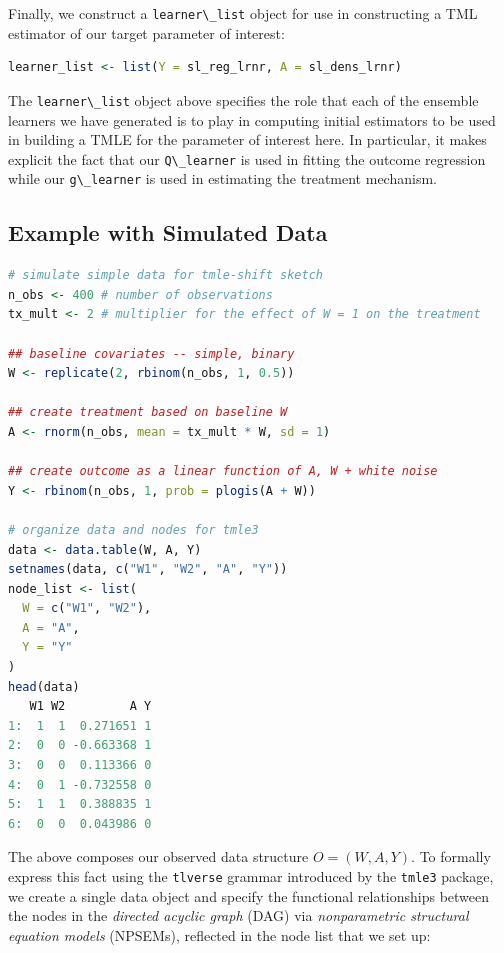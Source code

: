 \documentclass[12pt, krantz2,]{krantz}
\newcommand{\passthrough}[1]{#1}
\theoremstyle{definition}
\theoremstyle{definition}
\theoremstyle{definition}
\newcommand{\1}{\mathbbm{1}}
\begin{document}
Finally, we construct a \passthrough{\lstinline!learner\_list!} object for use in constructing a TML
estimator of our target parameter of interest:

\begin{lstlisting}[language=R]
learner_list <- list(Y = sl_reg_lrnr, A = sl_dens_lrnr)
\end{lstlisting}

The \passthrough{\lstinline!learner\_list!} object above specifies the role that each of the ensemble
learners we have generated is to play in computing initial estimators to be
used in building a TMLE for the parameter of interest here. In particular, it
makes explicit the fact that our \passthrough{\lstinline!Q\_learner!} is used in fitting the outcome
regression while our \passthrough{\lstinline!g\_learner!} is used in estimating the treatment mechanism.

\hypertarget{example-with-simulated-data}{%
\subsection{Example with Simulated Data}\label{example-with-simulated-data}}

\begin{lstlisting}[language=R]
# simulate simple data for tmle-shift sketch
n_obs <- 400 # number of observations
tx_mult <- 2 # multiplier for the effect of W = 1 on the treatment

## baseline covariates -- simple, binary
W <- replicate(2, rbinom(n_obs, 1, 0.5))

## create treatment based on baseline W
A <- rnorm(n_obs, mean = tx_mult * W, sd = 1)

## create outcome as a linear function of A, W + white noise
Y <- rbinom(n_obs, 1, prob = plogis(A + W))

# organize data and nodes for tmle3
data <- data.table(W, A, Y)
setnames(data, c("W1", "W2", "A", "Y"))
node_list <- list(
  W = c("W1", "W2"),
  A = "A",
  Y = "Y"
)
head(data)
   W1 W2         A Y
1:  1  1  0.271651 1
2:  0  0 -0.663368 1
3:  0  0  0.113366 0
4:  0  1 -0.732558 0
5:  1  1  0.388835 1
6:  0  0  0.043986 0
\end{lstlisting}

The above composes our observed data structure \(O = (W, A, Y)\). To formally
express this fact using the \passthrough{\lstinline!tlverse!} grammar introduced by the \passthrough{\lstinline!tmle3!} package,
we create a single data object and specify the functional relationships between
the nodes in the \emph{directed acyclic graph} (DAG) via \emph{nonparametric structural
equation models} (NPSEMs), reflected in the node list that we set up:
\end{document}
